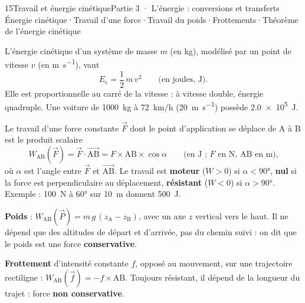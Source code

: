 \begin{ouverture}[newton]{15}{Travail et énergie cinétique}{Partie 3 · L'énergie : conversions et transferts}
{Énergie cinétique\enspace·\enspace Travail d'une force\enspace·\enspace Travail du poids\enspace·\enspace Frottements\enspace·\enspace Théorème de l'énergie cinétique}
\end{ouverture}
\essentiel
{}
\begin{definition}
L'énergie cinétique d'un système de masse $m$ (en kg), modélisé par un point de vitesse $v$ (en \unit{m.s^{-1}}), vaut
\[E_\mathrm{c}=\frac{1}{2}\,m\,v^2\qquad\text{(en joules, J).}\]
Elle est proportionnelle au carré de la vitesse : à vitesse double, énergie quadruple. Une voiture de \qty{1000}{kg} à \qty{72}{km/h} (\qty{20}{m.s^{-1}})
possède \qty{2,0e5}{J}.
\end{definition}
\begin{definition}
Le travail d'une force constante $\vec{F}$ dont le point d'application se déplace de A à B est le produit scalaire
\[W_{\mathrm{AB}}(\vec{F})=\vec{F}\cdot\overrightarrow{\mathrm{AB}}=F\times\mathrm{AB}\times\cos\alpha\qquad\text{(en J ; $F$ en N, AB en m),}\]
où $\alpha$ est l'angle entre $\vec{F}$ et $\overrightarrow{\mathrm{AB}}$. Le travail est \textbf{moteur} ($W>0$) si $\alpha<\ang{90}$, \textbf{nul} si la force est perpendiculaire
au déplacement, \textbf{résistant} ($W<0$) si $\alpha>\ang{90}$. Exemple : \qty{100}{N} à \ang{60} sur \qty{10}{m} donnent \qty{500}{J}.
\end{definition}
\begin{propriete}
\textbf{Poids} : $W_{\mathrm{AB}}(\vec{P})=m\,g\,(z_\mathrm{A}-z_\mathrm{B})$, avec un axe $z$ vertical vers le haut. Il ne dépend que des altitudes de départ et
d'arrivée, pas du chemin suivi : on dit que le poids est une force \textbf{conservative}.\par
\textbf{Frottement} d'intensité constante $f$, opposé au mouvement, sur une trajectoire rectiligne : $W_{\mathrm{AB}}(\vec{f})=-f\times\mathrm{AB}$. Toujours
résistant, il dépend de la longueur du trajet : force \textbf{non conservative}.
\end{propriete}
